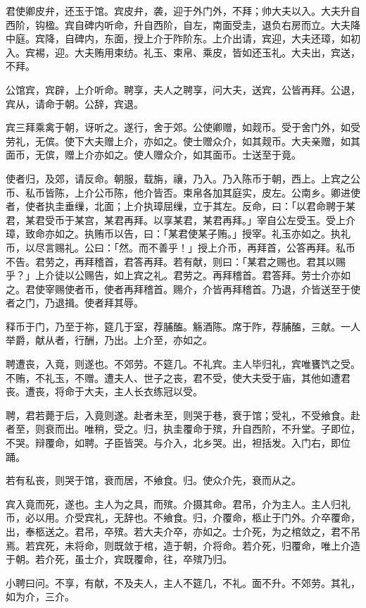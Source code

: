 \documentclass[]{article}
\begin{document}
君使卿皮弁，还玉于馆。宾皮弁，袭，迎于外门外，不拜；帅大夫以入。大夫升自西阶，钩楹。宾自碑内听命，升自西阶，自左，南面受圭，退负右房而立。大夫降中庭。宾降，自碑内，东面，授上介于阼阶东。上介出请，宾迎，大夫还璋，如初入。宾裼，迎。大夫贿用束纺。礼玉、束帛、乘皮，皆如还玉礼。大夫出，宾送，不拜。

公馆宾，宾辟，上介听命。聘享，夫人之聘享，问大夫，送宾，公皆再拜。公退，宾从，请命于朝。公辞，宾退。

宾三拜乘禽于朝，讶听之。遂行，舍于郊。公使卿赠，如觌币。受于舍门外，如受劳礼，无傧。使下大夫赠上介，亦如之。使士赠众介，如其觌币。大夫亲赠，如其面币，无傧，赠上介亦如之。使人赠众介，如其面币。士送至于竟。

使者归，及郊，请反命。朝服，载旃，禳，乃入。乃入陈币于朝，西上。上宾之公币、私币皆陈，上介公币陈，他介皆否。束帛各加其庭实，皮左。公南乡。卿进使者，使者执圭垂缫，北面；上介执璋屈缫，立于其左。反命，曰：「以君命聘于某君，某君受币于某宫，某君再拜。以享某君，某君再拜。」宰自公左受玉。受上介璋，致命亦如之。执贿币以告，曰：「某君使某子贿。」授宰。礼玉亦如之。执礼币，以尽言赐礼。公曰：「然。而不善乎！」授上介币，再拜首，公答再拜。私币不告。君劳之，再拜稽首，君答再拜。若有献，则曰：「某君之赐也。君其以赐乎？」上介徒以公赐告，如上宾之礼。君劳之。再拜稽首。君答拜。劳士介亦如之。君使宰赐使者币，使者再拜稽首。赐介，介皆再拜稽首。乃退，介皆送至于使者之门，乃退揖。使者拜其辱。

释币于门，乃至于祢，筵几于室，荐脯醢。觞酒陈。席于阼，荐脯醢，三献。一人举爵，献从者，行酬，乃出。上介至，亦如之。

聘遭丧，入竟，则遂也。不郊劳。不筵几。不礼宾。主人毕归礼，宾唯饔饩之受。不贿，不礼玉，不赠。遭夫人、世子之丧，君不受，使大夫受于庙，其他如遭君丧。遭丧，将命于大夫，主人长衣练冠以受。

聘，君若薨于后，入竟则遂。赴者未至，则哭于巷，衰于馆；受礼，不受飨食。赴者至，则衰而出。唯稍，受之。归，执圭覆命于殡，升自西阶，不升堂。子即位，不哭。辩覆命，如聘。子臣皆哭。与介入，北乡哭。出，袒括发。入门右，即位踊。

若有私丧，则哭于馆，衰而居，不飨食。归。使众介先，衰而从之。

宾入竟而死，遂也。主人为之具，而殡。介摄其命。君吊，介为主人。主人归礼币，必以用。介受宾礼，无辞也。不飨食。归，介覆命，柩止于门外。介卒覆命，出，奉柩送之。君吊，卒殡。若大夫介卒，亦如之。士介死，为之棺敛之，君不吊焉。若宾死，未将命，则既敛于棺，造于朝，介将命。若介死，归覆命，唯上介造于朝。若介死，虽士介，宾既覆命，往，卒殡乃归。

小聘曰问。不享，有献，不及夫人，主人不筵几，不礼。面不升。不郊劳。其礼，如为介，三介。
\end{document}
